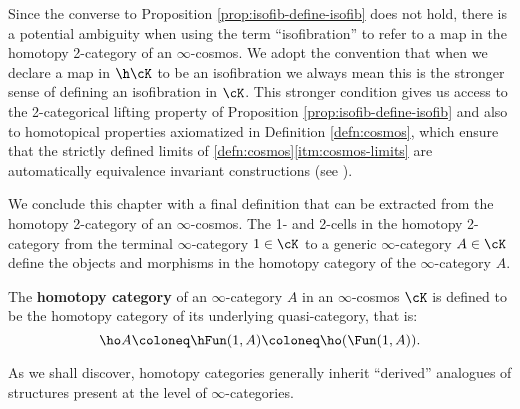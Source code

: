   \begin{con} Since the converse to Proposition \ref{prop:isofib-define-isofib} does not hold, there is a potential ambiguity when using the term ``isofibration'' to refer to a map in the homotopy 2-category of an $\infty$-cosmos. We adopt the convention that when we declare  a map in $\h\cK$ to be an isofibration we always mean this is the stronger sense of defining an isofibration in $\cK$. This stronger condition gives us access to the 2-categorical lifting property of Proposition \ref{prop:isofib-define-isofib} and also to homotopical properties axiomatized in Definition \ref{defn:cosmos}, which ensure that the strictly defined limits of \ref{defn:cosmos}\ref{itm:cosmos-limits} are automatically equivalence invariant constructions (see \cite[6.2.8,\S C.1]{RiehlVerity:2022eo}). %
  \end{con}

  We conclude this chapter with a final definition that can be extracted from the homotopy 2-category of an $\infty$-cosmos. The 1- and 2-cells in the homotopy 2-category from the terminal $\infty$-category $1 \in \cK$ to a generic $\infty$-category $A \in \cK$ define the objects and morphisms in the homotopy category of the $\infty$-category $A$.

  \begin{definition}\label{defn:htpy-cat-of-infinity-cat}
    The \textbf{homotopy category} of an $\infty$-category $A$ in an $\infty$-cosmos $\cK$ is defined to be the homotopy category of its underlying quasi-category, that is:
  \[ \ho A \coloneq \hFun(1,A) \coloneq \ho(\Fun(1,A)).\]
  \end{definition}

  As we shall discover, homotopy categories generally inherit ``derived'' analogues of structures present at the level of $\infty$-categories. %
